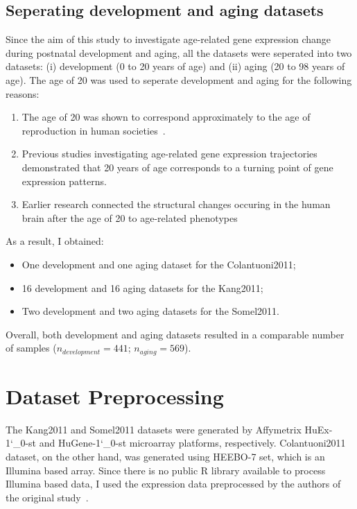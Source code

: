 \subsection{Seperating development and aging datasets}
Since the aim of this study to investigate age-related gene expression change during postnatal development and aging, all the datasets were seperated into two datasets: (i) development (0 to 20 years of age) and  (ii) aging (20 to 98 years of age).
The age of 20 was used to seperate development and aging for the following reasons:
\begin{enumerate}
    \item The age of 20 was shown to correspond approximately to the age of reproduction in human societies~\cite{Walker2006}.
    \item Previous studies investigating age-related gene expression trajectories demonstrated that 20 years of age corresponds to a turning point of gene expression patterns\cite{Colantuoni2011, Donertas2017,Somel2010}.
    \item Earlier research connected the structural changes occuring in the human brain after the age of 20 to age-related phenotypes~\cite{Sowell2004}
\end{enumerate}

As a result, I obtained:
\begin{itemize}
    \item One development and one aging dataset for the Colantuoni2011;
    \item 16 development and 16 aging datasets for the Kang2011;
    \item Two development and two aging datasets for the Somel2011.
\end{itemize}
Overall, both development and aging datasets resulted in a comparable number of samples ($n_{development} = 441$; $n_{aging}=569$).

\section{Dataset Preprocessing}
The Kang2011 and Somel2011 datasets were generated by Affymetrix HuEx-1\char`_0-st and HuGene-1\char`_0-st microarray platforms, respectively. 
Colantuoni2011 dataset, on the other hand, was generated using HEEBO-7 set, which is an Illumina based array. 
Since there is no public R library available to process Illumina based data, I used the expression data preprocessed by the authors of the original study~\cite{Colantuoni2011}.

